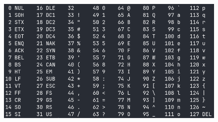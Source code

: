 \documentclass[xcolor=dvipsnames]{beamer}
\begin{document}
    \begin{frame}
        \begin{figure}
            \centering
            \includegraphics[width=1\textwidth]{src/ASCII.png}
        \end{figure}
    \end{frame}
\end{document}
